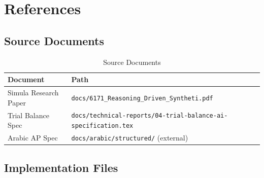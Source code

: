 \newpage
\chapter{References}
\label{chap:references}

\section{Source Documents}

\begin{table}[H]
\centering
\caption{Source Documents}
\begin{tabularx}{\textwidth}{lX}
\toprule
\textbf{Document} & \textbf{Path} \\
\midrule
Simula Research Paper & \texttt{docs/6171\_Reasoning\_Driven\_Syntheti.pdf} \\
Trial Balance Spec & \texttt{docs/technical-reports/04-trial-balance-ai-specification.tex} \\
Arabic AP Spec & \texttt{docs/arabic/structured/} (external) \\
\bottomrule
\end{tabularx}
\end{table}

\section{Implementation Files}

